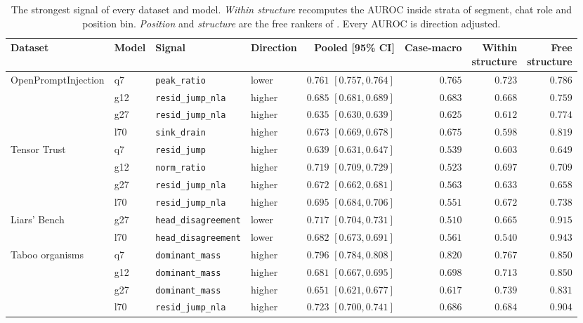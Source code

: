 \begin{table}[t]
\centering
\scriptsize
\setlength{\tabcolsep}{3pt}
\renewcommand{\arraystretch}{1.1}
\caption{The strongest signal of every dataset and model. \emph{Within structure} recomputes the AUROC inside strata of segment, chat role and position bin. \emph{Position} and \emph{structure} are the free rankers of . Every AUROC is direction adjusted.}
\label{tab:signal-controls}
\begin{tabular}{@{}llllrrrr@{}}
\toprule
Dataset & Model & Signal & Direction & Pooled [95\% CI] & Case-macro & \makecell[r]{Within\\structure} & \makecell[r]{Free\\structure} \\
\midrule
OpenPromptInjection & q7 & \texttt{peak\_ratio} & lower & \(0.761\) \([0.757, 0.764]\) & \(0.765\) & \(0.723\) & \(0.786\) \\
 & g12 & \texttt{resid\_jump\_nla} & higher & \(0.685\) \([0.681, 0.689]\) & \(0.683\) & \(0.668\) & \(0.759\) \\
 & g27 & \texttt{resid\_jump\_nla} & higher & \(0.635\) \([0.630, 0.639]\) & \(0.625\) & \(0.612\) & \(0.774\) \\
 & l70 & \texttt{sink\_drain} & higher & \(0.673\) \([0.669, 0.678]\) & \(0.675\) & \(0.598\) & \(0.819\) \\
\addlinespace
Tensor Trust & q7 & \texttt{resid\_jump} & higher & \(0.639\) \([0.631, 0.647]\) & \(0.539\) & \(0.603\) & \(0.649\) \\
 & g12 & \texttt{norm\_ratio} & higher & \(0.719\) \([0.709, 0.729]\) & \(0.523\) & \(0.697\) & \(0.709\) \\
 & g27 & \texttt{resid\_jump\_nla} & higher & \(0.672\) \([0.662, 0.681]\) & \(0.563\) & \(0.633\) & \(0.658\) \\
 & l70 & \texttt{resid\_jump\_nla} & higher & \(0.695\) \([0.684, 0.706]\) & \(0.551\) & \(0.672\) & \(0.738\) \\
\addlinespace
Liars' Bench & g27 & \texttt{head\_disagreement} & lower & \(0.717\) \([0.704, 0.731]\) & \(0.510\) & \(0.665\) & \(0.915\) \\
 & l70 & \texttt{head\_disagreement} & lower & \(0.682\) \([0.673, 0.691]\) & \(0.561\) & \(0.540\) & \(0.943\) \\
\addlinespace
Taboo organisms & q7 & \texttt{dominant\_mass} & higher & \(0.796\) \([0.784, 0.808]\) & \(0.820\) & \(0.767\) & \(0.850\) \\
 & g12 & \texttt{dominant\_mass} & higher & \(0.681\) \([0.667, 0.695]\) & \(0.698\) & \(0.713\) & \(0.850\) \\
 & g27 & \texttt{dominant\_mass} & higher & \(0.651\) \([0.621, 0.677]\) & \(0.617\) & \(0.739\) & \(0.831\) \\
 & l70 & \texttt{resid\_jump\_nla} & higher & \(0.723\) \([0.700, 0.741]\) & \(0.686\) & \(0.684\) & \(0.904\) \\
\bottomrule
\end{tabular}
\end{table}
